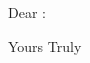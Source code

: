 \documentclass{letter}
\begin{document}
\begin{letter}{}
\opening{Dear :}












\closing{Yours Truly}
\end{letter}
\end{document}
